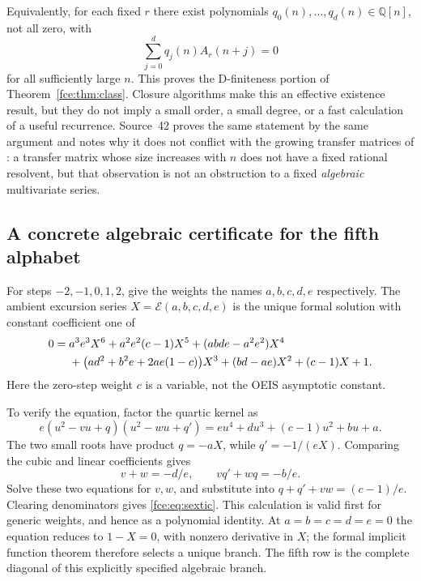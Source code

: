 \documentclass[11pt,a4paper]{article}
\numberwithin{equation}{section}
\theoremstyle{definition}\newtheorem{definition}[theorem]{Definition}
\theoremstyle{remark}\newtheorem{remark}[theorem]{Remark}
\newcommand{\Q}{\mathbb Q}
\newcommand{\E}{\mathcal E}
\begin{document}
Equivalently, for each fixed $r$ there exist polynomials
$q_0(n),\ldots,q_d(n)\in\Q[n]$, not all zero, with
\[
 \sum_{j=0}^d q_j(n)A_r(n+j)=0
\]
for all sufficiently large $n$. This proves the D-finiteness portion of
Theorem~\ref{fce:thm:class}. Closure algorithms make this an effective existence
result, but they do not imply a small order, a small degree, or a fast
calculation of a useful recurrence. Source~42 proves the same statement by
the same argument and notes why it does not conflict with the growing
transfer matrices of \cite{kk}: a transfer matrix whose size increases with
$n$ does not have a fixed rational resolvent, but that observation is not
an obstruction to a fixed \emph{algebraic} multivariate series.

\subsection{A concrete algebraic certificate for the fifth alphabet}
For steps $-2,-1,0,1,2$, give the weights the names $a,b,c,d,e$ respectively.
The ambient excursion series $X=\E(a,b,c,d,e)$ is the unique formal solution
with constant coefficient one of
\begin{align}\label{fce:eq:sextic}
0={}&a^3e^3X^6+a^2e^2(c-1)X^5+(abde-a^2e^2)X^4\notag\\
 &+\bigl(ad^2+b^2e+2ae(1-c)\bigr)X^3
 +(bd-ae)X^2+(c-1)X+1.
\end{align}
Here the zero-step weight $c$ is a variable, not the OEIS asymptotic constant.

To verify the equation, factor the quartic kernel as
\[
 e(u^2-vu+q)(u^2-wu+q')
 =eu^4+du^3+(c-1)u^2+bu+a.
\]
The two small roots have product $q=-aX$, while
$q'=-1/(eX)$. Comparing the cubic and linear coefficients gives
\[
 v+w=-d/e,\qquad vq'+wq=-b/e.
\]
Solve these two equations for $v,w$, and substitute into
$q+q'+vw=(c-1)/e$. Clearing denominators gives \eqref{fce:eq:sextic}.
This calculation is valid first for generic weights, and hence as a
polynomial identity. At $a=b=c=d=e=0$ the equation reduces to $1-X=0$,
with nonzero derivative in $X$; the formal implicit function theorem
therefore selects a unique branch. The fifth row is the complete diagonal
of this explicitly specified algebraic branch.
\end{document}
